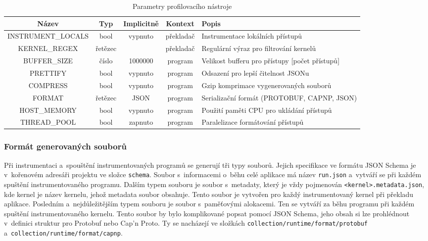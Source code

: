 \begin{table}[h]
	\centering
	\caption{Parametry profilovacího nástroje}
	\label{tab:parameters}
	\bgroup
	\def\arraystretch{1.2}
	\begin{tabularx}{\textwidth}{|c|c|c|c|Y|}
		\hline
		\textbf{Název} & \textbf{Typ} & \textbf{Implicitně} & \textbf{Kontext} & \textbf{Popis} \\
		\hline
		INSTRUMENT\_LOCALS & bool & vypnuto & překladač & Instrumentace lokálních přístupů \\
		\hline
		KERNEL\_REGEX & řetězec & & překladač & Regulární výraz pro filtrování kernelů \\
		\hline
		BUFFER\_SIZE & číslo & 1000000 & program & Velikost bufferu pro přístupy [počet přístupů] \\
		\hline
		PRETTIFY & bool & vypnuto & program & Odsazení pro lepší čitelnost JSONu \\
		\hline
		COMPRESS & bool & vypnuto & program & Gzip komprimace vygenerovaných souborů \\
		\hline
		FORMAT & řetězec & JSON & program & Serializační formát (PROTOBUF, CAPNP, JSON) \\
		\hline
		HOST\_MEMORY & bool & vypnuto & program & Použití paměti CPU pro ukládání přístupů \\
		\hline
		THREAD\_POOL & bool & zapnuto & program & Paralelizace formátování přístupů \\
		\hline
	\end{tabularx}
	\egroup
\end{table}

\subsubsection{Formát generovaných souborů}
Při instrumentaci a~spouštění instrumentovaných programů se generují tři typy souborů. Jejich specifikace ve formátu JSON Schema je v~kořenovém adresáři projektu ve složce \texttt{schema}. Soubor s~informacemi o~běhu celé aplikace má název \texttt{run.json} a~vytváří se při každém spuštění instrumentovaného programu. Dalším typem souboru je soubor s~metadaty, který je vždy pojmenován \texttt{<kernel>.metadata.json}, kde kernel je název kernelu, jehož metadata soubor obsahuje. Tento soubor je vytvořen pro každý instrumentovaný kernel při překladu aplikace. Posledním a~nejdůležitějším typem souboru je soubor s~paměťovými alokacemi. Ten se vytváří za běhu programu při každém spuštění instrumentovaného kernelu. Tento soubor by bylo komplikované popsat pomocí JSON Schema, jeho obsah si lze prohlédnout v~definici struktur pro Protobuf nebo Cap'n Proto. Ty se nacházejí ve složkách \texttt{collection/runtime/format/protobuf} a~\texttt{collection/runtime/format/capnp}.

